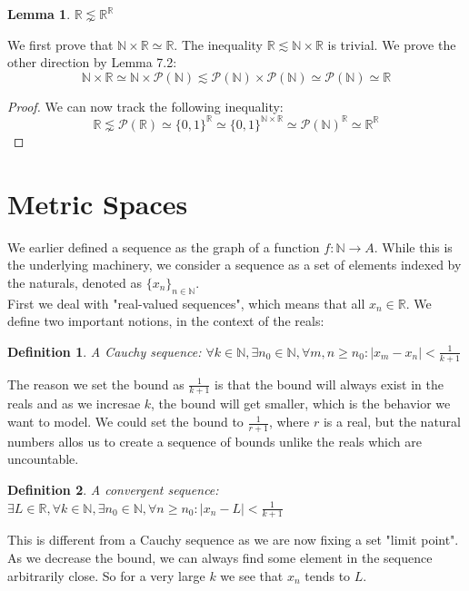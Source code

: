 \documentclass{article}
\newtheorem{lem}{Lemma}[section]
\newtheorem{defn}{Definition}[section]
\begin{document}
\begin{lem}
$\mathbb{R} \lnsim \mathbb{R}^\mathbb{R}$
\end{lem}
We first prove that $\mathbb{N} \times \mathbb{R} \simeq \mathbb{R}$. The inequality $\mathbb{R} \lesssim \mathbb{N} \times \mathbb{R}$ is trivial. We prove the other direction by Lemma 7.2:
\begin{equation*}
    \mathbb{N} \times \mathbb{R} \simeq \mathbb{N} \times \mathcal{P}(\mathbb{N}) \lesssim \mathcal{P}(\mathbb{N}) \times \mathcal{P}(\mathbb{N}) \simeq \mathcal{P}(\mathbb{N}) \simeq \mathbb{R}
\end{equation*}
\begin{proof}
We can now track the following inequality:
\begin{equation*}
    \mathbb{R} \lnsim \mathcal{P}(\mathbb{R}) \simeq \{0, 1\}^\mathbb{R} \simeq \{0, 1\}^{\mathbb{N} \times \mathbb{R}} \simeq \mathcal{P}(\mathbb{N})^\mathbb{R} \simeq \mathbb{R}^\mathbb{R}
\end{equation*}
\end{proof}
\pagebreak

\section{Metric Spaces}
We earlier defined a sequence as the graph of a function $f: \mathbb{N} \xrightarrow{} A$. While this is the underlying machinery, we consider a sequence as a set of elements indexed by the naturals, denoted as $\{x_n\}_{n \in \mathbb{N}}$.\\

First we deal with "real-valued sequences", which means that all $x_n \in \mathbb{R}$. We define two important notions, in the context of the reals:
\begin{defn}
A Cauchy sequence: $\forall k \in \mathbb{N}, \exists n_0 \in \mathbb{N}, \forall m, n \geqslant n_0: |x_m - x_n| < \frac{1}{k+1}$
\end{defn}
The reason we set the bound as $\frac{1}{k+1}$ is that the bound will always exist in the reals and as we incresae $k$, the bound will get smaller, which is the behavior we want to model. We could set the bound to $\frac{1}{r+1}$, where $r$ is a real, but the natural numbers allos us to create a sequence of bounds unlike the reals which are uncountable.\\

\medskip
\begin{defn}
A convergent sequence: $\exists L \in \mathbb{R}, \forall k \in \mathbb{N}, \exists n_0 \in \mathbb{N}, \forall n \geqslant n_0: |x_n - L| < \frac{1}{k+1}$
\end{defn}
This is different from a Cauchy sequence as we are now fixing a set "limit point". As we decrease the bound, we can always find some element in the sequence arbitrarily close. So for a very large $k$ we see that $x_n$ tends to $L$.\\
\end{document}
